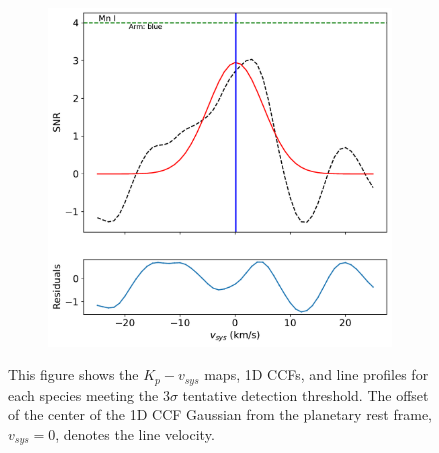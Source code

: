 \documentclass[twocolumn]{aastex631}
\begin{document}
\begin{figure}[ht!]
\begin{subfigure}[b]{0.333\textwidth}
            \end{subfigure}
            \begin{subfigure}[b]{0.333\textwidth}\label{fig:1d-ccf-Mn-combined}
                \includegraphics[width=\textwidth]{plots-updated/line-profile/blue/KELT-20b.20190504.blue.Mn.SNR-Gaussian.pdf}
                
            \end{subfigure}


        \caption{This figure shows the $K_p-v_{sys}$ maps, 1D CCFs, and line profiles for each species meeting the ${3\sigma}$ tentative detection threshold. The offset of the center of the 1D CCF Gaussian from the planetary rest frame, ${v_{sys}}=0$, denotes the line velocity. 
    }
        

        \end{figure}



        
\end{document}
